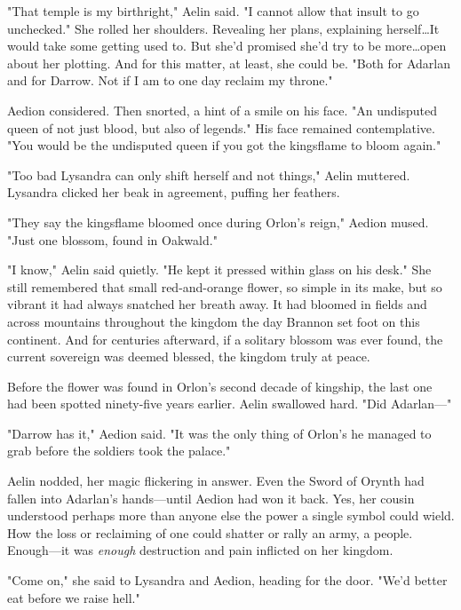 "That temple is my birthright," Aelin said.
"I cannot allow that insult to go unchecked."
She rolled her shoulders.
Revealing her plans, explaining herself\ldots It would take some getting used to.
But she'd promised she'd try to be more\ldots open about her plotting.
And for this matter, at least, she could be.
"Both for Adarlan and for Darrow.
Not if I am to one day reclaim my throne."

Aedion considered.
Then snorted, a hint of a smile on his face.
"An undisputed queen of not just blood, but also of legends."
His face remained contemplative.
"You would be the undisputed queen if you got the kingsflame to bloom again."

"Too bad Lysandra can only shift herself and not things," Aelin muttered.
Lysandra clicked her beak in agreement, puffing her feathers.

"They say the kingsflame bloomed once during Orlon's reign," Aedion mused.
"Just one blossom, found in Oakwald."

"I know," Aelin said quietly.
"He kept it pressed within glass on his desk."
She still remembered that small red-and-orange flower, so simple in its make, but so vibrant it had always snatched her breath away.
It had bloomed in fields and across mountains throughout the kingdom the day Brannon set foot on this continent.
And for centuries afterward, if a solitary blossom was ever found, the current sovereign was deemed blessed, the kingdom truly at peace.

Before the flower was found in Orlon's second decade of kingship, the last one had been spotted ninety-five years earlier.
Aelin swallowed hard.
"Did Adarlan---"

"Darrow has it," Aedion said.
"It was the only thing of Orlon's he managed to grab before the soldiers took the palace."

Aelin nodded, her magic flickering in answer.
Even the Sword of Orynth had fallen into Adarlan's hands---until Aedion had won it back.
Yes, her cousin understood perhaps more than anyone else the power a single symbol could wield.
How the loss or reclaiming of one could shatter or rally an army, a people.
Enough---it was \emph{enough} destruction and pain inflicted on her kingdom.

"Come on," she said to Lysandra and Aedion, heading for the door.
"We'd better eat before we raise hell."
